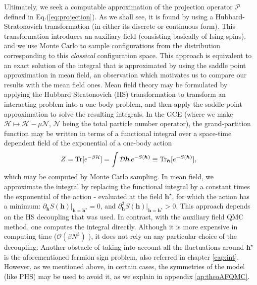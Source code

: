 Ultimately, we seek a computable approximation of the projection operator $\mathcal{P}$ defined in Eq.(\ref{eq:projection}).
As we shall see, it is found by using a Hubbard-Stratonovich transformation (in either its discrete or continuous form).
This transformation introduces an auxiliary field (consisting basically of Ising spins), and we use Monte Carlo to sample configurations from the distribution corresponding to this \emph{classical} configuration space.
This approach is equivalent to an exact solution of the integral that is approximated by using the saddle point approximation in mean field, an observation which motivates us to compare our results with the mean field ones.
Mean field theory may be formulated by applying the Hubbard Stratonovich (HS)  transformation to transform an interacting problem into a one-body problem, and then apply the saddle-point approximation to solve the resulting integrals.
In the \acs{GCE} (where we make $\mathcal{H} \mapsto \mathcal{H} - \mu \mathcal{N}$, $\mathcal{N}$ being the total particle number operator), the grand-partition function may be written in terms of a functional integral over a space-time dependent field of the exponential of a one-body action
\begin{equation}
Z = \operatorname{Tr} [ e^{-\beta \mathcal{H} } ] = \int \mathcal{D}\bm h \, e^{-S(\bm h) }  \equiv \operatorname{Tr}_{\bm h} [ e^{-S(\bm h)} ],
\end{equation}
which may be computed by Monte Carlo sampling.
In mean field, we approximate the integral by replacing the functional integral by a constant times the exponential of the action - evaluated at the field $\bm h^\star$, for which the action has a minimum: $\partial_{\bm h} S( \bm h ) |_{\bm h = \bm h^\star} = 0$, and $\partial_{\bm h}^2 S( \bm h ) |_{\bm h = \bm h^\star} > 0$.
This approach depends on the HS decoupling that was used.
In contrast, with the auxiliary field \ac{QMC} method, one computes the integral directly.
Although it is more expensive in computing time ($\mathcal{O}(\beta N^3)$ ), it does not rely on any particular choice of the decoupling.
Another obstacle of taking into account all the fluctuations around $\bm h^\star$ is the aforementioned fermion sign problem, also referred in chapter \ref{cap:int}.
However, as we mentioned above, in certain cases, the symmetries of the model (like \ac{PHS}) may be used to avoid it, as we explain in appendix \ref{ap:theoAFQMC}.
